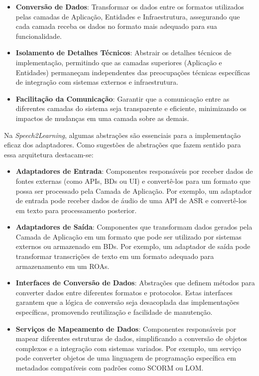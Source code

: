 \begin{itemize}
    \item \textbf{Conversão de Dados}: Transformar os dados entre os formatos utilizados pelas camadas de Aplicação, Entidades e Infraestrutura, assegurando que cada camada receba os dados no formato mais adequado para sua funcionalidade.

    \item \textbf{Isolamento de Detalhes Técnicos}: Abstrair os detalhes técnicos de implementação, permitindo que as camadas superiores (Aplicação e Entidades) permaneçam independentes das preocupações técnicas específicas de integração com sistemas externos e infraestrutura.

    \item \textbf{Facilitação da Comunicação}: Garantir que a comunicação entre as diferentes camadas do sistema seja transparente e eficiente, minimizando os impactos de mudanças em uma camada sobre as demais.
\end{itemize}

Na \textit{Speech2Learning}, algumas abstrações são essenciais para a implementação eficaz dos adaptadores. Como sugestões de abstrações que fazem sentido para essa arquitetura destacam-se:

\begin{itemize}
    \item \textbf{Adaptadores de Entrada}: Componentes responsáveis por receber dados de fontes externas (como APIs, BDs ou UI) e convertê-los para um formato que possa ser processado pela Camada de Aplicação. Por exemplo, um adaptador de entrada pode receber dados de áudio de uma API de ASR e convertê-los em texto para processamento posterior.

    \item \textbf{Adaptadores de Saída}: Componentes que transformam dados gerados pela Camada de Aplicação em um formato que pode ser utilizado por sistemas externos ou armazenado em BDs. Por exemplo, um adaptador de saída pode transformar transcrições de texto em um formato adequado para armazenamento em um ROAs.

    \item \textbf{Interfaces de Conversão de Dados}: Abstrações que definem métodos para converter dados entre diferentes formatos e protocolos. Estas interfaces garantem que a lógica de conversão seja desacoplada das implementações específicas, promovendo reutilização e facilidade de manutenção.

    \item \textbf{Serviços de Mapeamento de Dados}: Componentes responsáveis por mapear diferentes estruturas de dados, simplificando a conversão de objetos complexos e a integração com sistemas variados. Por exemplo, um serviço pode converter objetos de uma linguagem de programação específica em metadados compatíveis com padrões como SCORM ou LOM.
\end{itemize}

